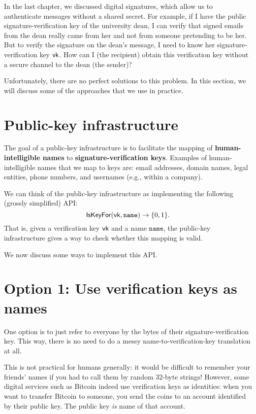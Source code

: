 In the last chapter, we discussed digital
signatures, which allow us to authenticate messages
without a shared secret.
For example, if I have the public signature-verification key 
of the university dean, I can verify that signed emails from 
the dean really came from her and not from someone pretending to be her.
But to verify the signature on the dean's message, I need to know her
signature-verification key $\mathsf{vk}$.
How can I (the recipient) obtain this verification key without
a secure channel to the dean (the sender)?

Unfortunately, there are no perfect solutions to this problem.
In this section, we will discuss some of the approaches that
we use in practice.

\section{Public-key infrastructure}

The goal of a public-key infrastructure is to facilitate
the mapping of \textbf{human-intelligible names} to
\textbf{signature-verification keys}.
Examples of human-intelligible names that we map to keys
are: email addresses, domain names, legal entities, phone numbers, and
usernames (e.g., within a company).

We can think of the public-key infrastructure as implementing
the following (grossly simplified) API:
\[ \mathsf{IsKeyFor}(\mathsf{vk}, \texttt{name}) \to \{0,1\}.\]
That is, given a verification key $\mathsf{vk}$ and a name $\texttt{name}$, 
the public-key infrastructure gives a way to check whether this mapping
is valid.


We now discuss some ways to implement this API.

\section{Option 1: Use verification keys as names}
One option is to just refer to everyone by the bytes of
their signature-verification key.
This way, there is no need to do a messy name-to-verification-key 
translation at all.

This is not practical for humans generally: it would be difficult
to remember your friends' names if you had to call them by 
random 32-byte strings!
However, some digital services such as Bitcoin indeed use verification
keys as identities: when you want to transfer Bitcoin to someone,
you send the coins to an account identified by their public key.
The public key \emph{is} name of that account.

